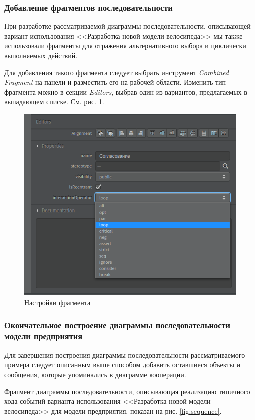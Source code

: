 \documentclass[a4paper,12pt]{extreport}
\begin{document}
\subsubsection*{Добавление фрагментов последовательности}

При разработке рассматриваемой диаграммы последовательности, описывающей вариант использования <<Разработка новой модели велосипеда>> мы также использовали фрагменты для отражения альтернативного выбора и циклически выполняемых действий.

Для добавления такого фрагмента следует выбрать инструмент \textit{Combined Fragment} на панели и разместить его на рабочей области. 
Изменить тип фрагмента можно в секции \textit{Editors}, выбрав один из вариантов, предлагаемых в выпадающем списке. См. рис. \ref{fig:sequenceeditors2}.

\begin{figure}[h!]
	\centering
	\includegraphics[width=0.5\linewidth]{images/sequenceeditors2}
	\caption{Настройки фрагмента}
	\label{fig:sequenceeditors2}
\end{figure}

\subsubsection*{Окончательное построение диаграммы последовательности модели предприятия}
Для завершения построения диаграммы последовательности рассматриваемого примера следует описанным выше способом добавить оставшиеся объекты и сообщения, которые упоминались в диаграмме кооперации.

Фрагмент диаграммы последовательности, описывающая реализацию типичного хода событий варианта использования <<Разработка новой модели велосипеда>> для модели предприятия, показан на рис. \ref{fig:sequence}.
\end{document}
